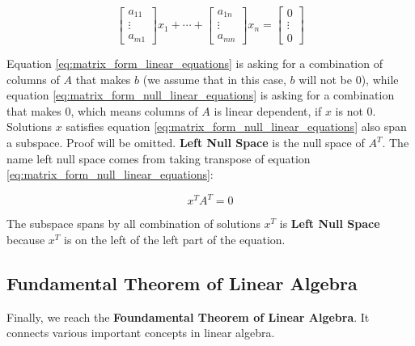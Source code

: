 \documentclass[a4paper]{book}
\begin{document}
      \begin{displaymath}
        \begin{bmatrix}
          a_{11} \\
          \vdots \\
          a_{m1}
        \end{bmatrix}
        x_{1} + \cdots + 
        \begin{bmatrix}
          a_{1n} \\
          \vdots \\
          a_{mn}
        \end{bmatrix}
        x_{n}
        = 
        \begin{bmatrix}
          0 \\
          \vdots \\
          0
        \end{bmatrix}
      \end{displaymath}

      Equation \ref{eq:matrix_form_linear_equations} is asking for a
      combination of columns of $A$ that makes $b$ (we assume that in
      this case, $b$ will not be $0$), while equation
      \ref{eq:matrix_form_null_linear_equations} is asking for a
      combination that makes $0$, which means columns of $A$ is linear
      dependent, if $x$ is not $0$. Solutions $x$ satisfies equation
      \ref{eq:matrix_form_null_linear_equations} also span a subspace.
      Proof will be omitted. \textbf{Left Null Space} is the null space
      of $A^{T}$. The name left null space comes from taking transpose
      of equation \ref{eq:matrix_form_null_linear_equations}:

      \begin{displaymath}
        x^{T}A^{T} = 0
      \end{displaymath}

      The subspace spans by all combination of solutions $x^{T}$ is
      \textbf{Left Null Space} because $x^{T}$ is on the left of the
      left part of the equation.

    \subsection{Fundamental Theorem of Linear
      Algebra\cite{gilbert_strang_foundamental_theorem_of_linear_algebra}}
    \label{subsec:Fundamental Theorem of Linear Algebra}

    Finally, we reach the \textbf{Foundamental Theorem of Linear
      Algebra}. It connects various important concepts in linear
    algebra.
\end{document}
